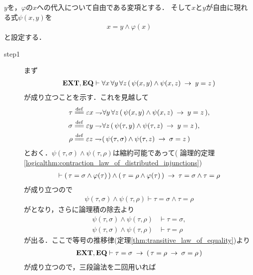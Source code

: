 	\begin{sketch}
		$y$を，$\varphi$の$x$への代入について自由である変項とする．
		そして$x$と$y$が自由に現れる式$\psi(x,y)$を
		\begin{align}
			x = y \wedge \varphi(x)
		\end{align}
		と設定する．
		\begin{description}
			\item[step1]
				まず
				\begin{align}
					\mbox{{\bf EXT}},\mbox{{\bf EQ}} \vdash \forall x\, \forall y\, \forall z\, 
					(\, \psi(x,y) \wedge \psi(x,z) \hspace{0.25em}\rightarrow\hspace{0.25em} y = z\, )
					\label{fom:thm_axiom_of_separation_1}
				\end{align}
				が成り立つことを示す．これを見越して
				\begin{align}
					\tau &\defeq \varepsilon x \negation \forall y\, \forall z\, 
					(\, \psi(x,y) \wedge \psi(x,z) \rarrow y = z\, ), \\
					\sigma &\defeq \varepsilon y \negation \forall z\, 
					(\, \psi(\tau,y) \wedge \psi(\tau,z) \rarrow y = z\, ), \\
					\rho &\defeq \varepsilon z \negation 
					(\, \psi(\tau,\sigma) \wedge \psi(\tau,z) \rarrow \sigma = z\, )
				\end{align}
				とおく．$\psi(\tau,\sigma) \wedge \psi(\tau,\rho)$は縮約可能であって(
				論理的定理\ref{logicalthm:contraction_law_of_distributed_injunctions})
				\begin{align}
					\vdash (\, \tau = \sigma \wedge \varphi(\tau)\, )
						\wedge (\, \tau = \rho \wedge \varphi(\tau)\, )
						\hspace{0.25em}\rightarrow\hspace{0.25em} \tau = \sigma \wedge \tau = \rho
				\end{align}
				が成り立つので
				\begin{align}
					\psi(\tau,\sigma) \wedge \psi(\tau,\rho) 
					\vdash \tau = \sigma \wedge \tau = \rho
				\end{align}
				がとなり，さらに論理積の除去より
				\begin{align}
					\psi(\tau,\sigma) \wedge \psi(\tau,\rho) &\vdash \tau = \sigma, \\
					\psi(\tau,\sigma) \wedge \psi(\tau,\rho) &\vdash \tau = \rho
				\end{align}
				が出る．ここで等号の推移律(定理\ref{thm:transitive_law_of_equality})より
				\begin{align}
					\mbox{{\bf EXT}},\mbox{{\bf EQ}} \vdash \tau = \sigma \hspace{0.25em}\rightarrow\hspace{0.25em} 
						(\, \tau = \rho \hspace{0.25em}\rightarrow\hspace{0.25em} \sigma = \rho\, )
				\end{align}
				が成り立つので，三段論法を二回用いれば

\end{description}
\end{sketch}
